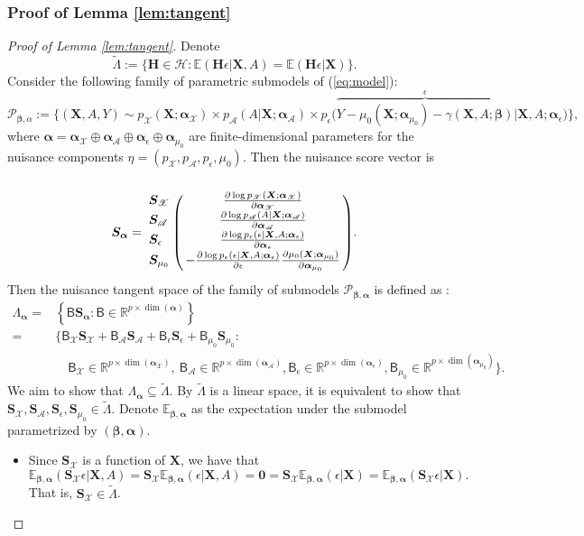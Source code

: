 \documentclass[11pt]{article}
\numberwithin{equation}{section}
\theoremstyle{definition}
\theoremstyle{remark}
\newcommand{\bH}{\bm{H}}
\newcommand{\bS}{\bm{S}}
\newcommand{\bX}{\bm{X}}
\newcommand{\bbeta}{\bm{\beta}}
\newcommand{\balpha}{\bm{\alpha}}
\newcommand{\bbE}{\mathbb{E}}
\newcommand{\bbR}{\mathbb{R}}
\newcommand{\cH}{\mathcal{H}}
\newcommand{\sA}{\mathscr{A}}
\newcommand{\sP}{\mathscr{P}}
\newcommand{\sX}{\mathscr{X}}
\newcommand{\sfB}{\mathsf{B}}
\newcommand{\bzero}{\mathbf{0}}	%
\begin{document}
\subsubsection{Proof of Lemma \ref{lem:tangent}}

\begin{proof}[Proof of Lemma \ref{lem:tangent}] Denote 
	\[ \widetilde{\Lambda} := \Big\{ \bH \in \cH: \bbE(\bH\epsilon|\bX,A) = \bbE(\bH\epsilon|\bX)\Big\}. \]
	Consider the following family of parametric submodels of (\ref{eq:model}):
	\[ \sP_{\bbeta,\alpha} := \Big\{ (\bX,A,Y) \sim p_{\sX}(\bX;\balpha_{\sX}) \times p_{\sA}(A|\bX;\balpha_{\sA}) \times p_{\epsilon}\big( \overbrace{Y - \mu_{0}(\bX;\balpha_{\mu_{0}}) - \gamma(\bX,A;\bbeta)}^{\epsilon}\big| \bX, A; \balpha_{\epsilon} \big) \Big\}, \]
	where $ \balpha = \balpha_{\sX} \oplus \balpha_{\sA} \oplus \balpha_{\epsilon} \oplus \balpha_{\mu_{0}} $ are finite-dimensional parameters for the nuisance components $ \eta = (p_{\sX},p_{\sA},p_{\epsilon},\mu_{0}) $. Then the nuisance score vector is
	\[ \bS_{\balpha} = \bordermatrix{
		~ & \cr
		\bS_{\sX} & {\partial \log p_{\sX}(\bX;\balpha_{\sX}) \over \partial\balpha_{\sX}} \cr 
		\bS_{\sA} & {\partial \log p_{\sA}(A|\bX;\balpha_{\sA}) \over \partial\balpha_{\sA}} \cr
		\bS_{\epsilon} & {\partial \log p_{\epsilon}(\epsilon|\bX,A;\balpha_{\epsilon}) \over \partial\balpha_{\epsilon}} \cr 
		\bS_{\mu_{0}} & -{\partial \log p_{\epsilon}(\epsilon|\bX,A;\balpha_{\epsilon}) \over \partial\epsilon}{\partial \mu_{0}(\bX;\balpha_{\mu_{0}}) \over \partial \balpha_{\mu_{0}}}
	}.
	\]
	Then the nuisance tangent space of the family of submodels $ \sP_{\bbeta,\balpha} $ is defined as \citep{tsiatis2007semiparametric}:
	\begin{align*}
		\Lambda_{\balpha} =& \left\{ \sfB \bS_{\balpha}: \sfB \in \bbR^{p \times \dim(\balpha)} \right\} \\
		=& \Big\{ \sfB_{\sX}\bS_{\sX} + \sfB_{\sA}\bS_{\sA} + \sfB_{\epsilon}\bS_{\epsilon} + \sfB_{\mu_{0}}\bS_{\mu_{0}}: \\
		&\quad \sfB_{\sX} \in \bbR^{p \times \dim(\balpha_{\sX})}, ~ \sfB_{\sA} \in \bbR^{p \times \dim(\balpha_{\sA})}, \sfB_{\epsilon} \in \bbR^{p \times \dim(\balpha_{\epsilon})}, \sfB_{\mu_{0}} \in \bbR^{p \times \dim(\balpha_{\mu_{0}})} \Big\}.
	\end{align*}
	We aim to show that $ \Lambda_{\balpha} \subseteq \widetilde{\Lambda} $. By $ \widetilde{\Lambda} $ is a linear space, it is equivalent to show that $ \bS_{\sX},\bS_{\sA},\bS_{\epsilon},\bS_{\mu_{0}} \in \widetilde{\Lambda} $. Denote $ \bbE_{\bbeta,\balpha} $ as the expectation under the submodel parametrized by $ (\bbeta,\balpha) $. 
	\begin{itemize}
		\item Since $ \bS_{\sX} $ is a function of $ \bX $, we have that 
		\[ \bbE_{\bbeta,\balpha}(\bS_{\sX}\epsilon|\bX,A) = \bS_{\sX}\bbE_{\bbeta,\balpha}(\epsilon|\bX,A) = \bzero = \bS_{\sX}\bbE_{\bbeta,\balpha}(\epsilon|\bX) = \bbE_{\bbeta,\balpha}(\bS_{\sX}\epsilon|\bX). \]
		That is, $ \bS_{\sX} \in \widetilde{\Lambda} $.
		

\end{itemize}
\end{proof}
\end{document}
